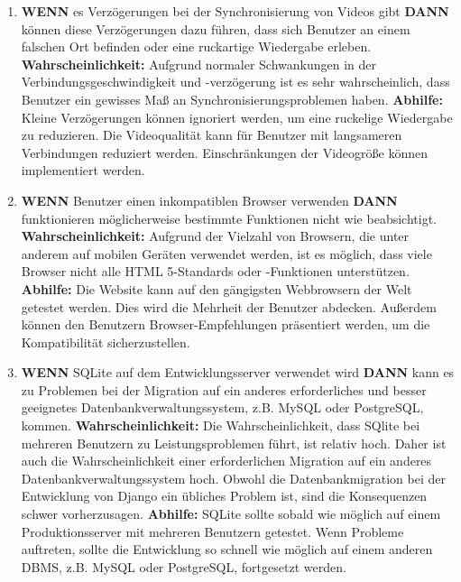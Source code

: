 \begin{enumerate}
    \item
    \textbf{WENN} es Verzögerungen bei der Synchronisierung von Videos gibt \textbf{DANN} können diese Verzögerungen dazu führen, dass sich Benutzer an einem falschen Ort befinden oder eine ruckartige Wiedergabe erleben.
    \linebreak
    \linebreak
    \textbf{Wahrscheinlichkeit:} Aufgrund normaler Schwankungen in der Verbindungsgeschwindigkeit und -verzögerung ist es sehr wahrscheinlich, dass Benutzer ein gewisses Maß an Synchronisierungsproblemen haben.
    \linebreak
    \linebreak
    \textbf{Abhilfe:}  Kleine Verzögerungen können ignoriert werden, um eine ruckelige Wiedergabe zu reduzieren. Die Videoqualität kann für Benutzer mit langsameren Verbindungen reduziert werden. Einschränkungen der Videogröße können implementiert werden.
    \linebreak
    
    \item
    \textbf{WENN} Benutzer einen inkompatiblen Browser verwenden \textbf{DANN} funktionieren möglicherweise bestimmte Funktionen nicht wie beabsichtigt.
    \linebreak
    \linebreak
    \textbf{Wahrscheinlichkeit:} Aufgrund der Vielzahl von Browsern, die unter anderem auf mobilen Geräten verwendet werden, ist es möglich, dass viele Browser nicht alle HTML 5-Standards oder -Funktionen unterstützen.
    \linebreak
    \linebreak
    \textbf{Abhilfe:} Die Website kann auf den gängigsten Webbrowsern der Welt getestet werden. Dies wird die Mehrheit der Benutzer abdecken. Außerdem können den Benutzern Browser-Empfehlungen präsentiert werden, um die Kompatibilität sicherzustellen.
    \linebreak
    
    \item
    \textbf{WENN} SQLite auf dem Entwicklungsserver verwendet wird \textbf{DANN} kann es zu Problemen bei der Migration auf ein anderes erforderliches und besser geeignetes Datenbankverwaltungssystem, z.B.  MySQL oder PostgreSQL,  kommen.
    \linebreak
    \linebreak
    \textbf{Wahrscheinlichkeit:} Die Wahrscheinlichkeit, dass SQlite bei mehreren Benutzern zu Leistungsproblemen führt, ist relativ hoch. Daher ist auch die Wahrscheinlichkeit einer erforderlichen Migration auf ein anderes Datenbankverwaltungssystem hoch. Obwohl die Datenbankmigration bei der Entwicklung von Django ein übliches Problem ist, sind die Konsequenzen schwer vorherzusagen.
    \linebreak
    \linebreak
    \textbf{Abhilfe:} SQLite sollte sobald wie möglich auf einem Produktionsserver mit mehreren Benutzern getestet. Wenn Probleme auftreten, sollte die Entwicklung so schnell wie möglich auf einem anderen DBMS, z.B.  MySQL oder PostgreSQL, fortgesetzt werden.
    \linebreak


\end{enumerate}



